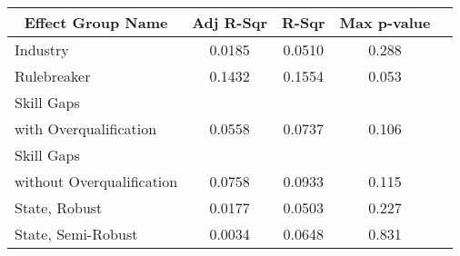 {
\def\sym#1{\ifmmode^{#1}\else\(^{#1}\)\fi}
\begin{tabular}{l*{4}{c}}
    \toprule
    \multicolumn{1}{c}{Effect Group Name} & \multicolumn{1}{c}{Adj R-Sqr} & \multicolumn{1}{c}{R-Sqr} & \multicolumn{1}{c}{Max p-value} \\
    \midrule
    Industry                              & 0.0185                        & 0.0510                    & 0.288                           \\
    \addlinespace
    Rulebreaker                           & 0.1432                        & 0.1554                    & 0.053                           \\
    \addlinespace
    Skill Gaps                            &                               &                           &                                 \\
    with Overqualification                & 0.0558                        & 0.0737                    & 0.106                           \\
    \addlinespace
    Skill Gaps                            &                               &                           &                                 \\
    without Overqualification             & 0.0758                        & 0.0933                    & 0.115                           \\
    \addlinespace
    State, Robust                         & 0.0177                        & 0.0503                    & 0.227                           \\
    \addlinespace
    State, Semi-Robust                    & 0.0034                        & 0.0648                    & 0.831                           \\
    \bottomrule
\end{tabular}
}

